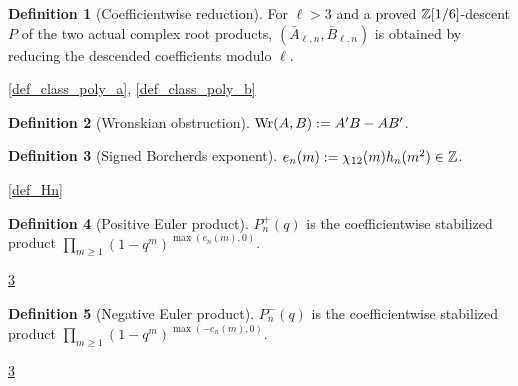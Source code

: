 \documentclass[11pt,a4paper]{article}
\numberwithin{equation}{section}
\theoremstyle{plain}\newtheorem{theorem}{Theorem}[section]\newaliascnt{proposition}{theorem}\newtheorem{proposition}[proposition]{Proposition}\aliascntresetthe{proposition}\newaliascnt{lemma}{theorem}\newtheorem{lemma}[lemma]{Lemma}\aliascntresetthe{lemma}
\theoremstyle{definition}\newaliascnt{definition}{theorem}\newtheorem{definition}[definition]{Definition}\aliascntresetthe{definition}\newaliascnt{notation}{theorem}\newtheorem{notation}[notation]{Notation}\aliascntresetthe{notation}
\providecommand{\lean}[1]{}\providecommand{\leanok}{}
\begin{document}
\begin{definition}[Coefficientwise reduction]\label{def_reduced_class_polys}\lean{SptCM.CM.Repaired.ActualClassPolynomialSpec.actualReducedClassPolynomials}\leanok
For $\ell>3$ and a proved $\mathbb Z[1/6]$-descent $P$ of the two actual complex root products, $(\bar A_{\ell,n},\bar B_{\ell,n})$ is obtained by reducing the descended coefficients modulo $\ell$.
\end{definition}
\begin{uses-statement}\ref{def_class_poly_a}, \ref{def_class_poly_b}\end{uses-statement}
\begin{definition}[Wronskian obstruction]\label{def_wronskian}\lean{SptCM.wronskianObstruction}\leanok
$\operatorname{Wr}(A,B):=A'B-AB'$.
\end{definition}
\begin{definition}[Signed Borcherds exponent]\label{def_signed_exponent}\lean{SptCM.Repair.signedEulerExponent}\leanok
$e_n(m):=\chi_{12}(m)h_n(m^2)\in\mathbb Z$.
\end{definition}
\begin{uses-statement}\ref{def_Hn}\end{uses-statement}
\begin{definition}[Positive Euler product]\label{def_euler_product_plus}\lean{SptCM.Repair.eulerProductPlus}\leanok
$P_n^+(q)$ is the coefficientwise stabilized product $\prod_{m\ge1}(1-q^m)^{\max(e_n(m),0)}$.
\end{definition}
\begin{uses-statement}\ref{def_signed_exponent}\end{uses-statement}
\begin{definition}[Negative Euler product]\label{def_euler_product_minus}\lean{SptCM.Repair.eulerProductMinus}\leanok
$P_n^-(q)$ is the coefficientwise stabilized product $\prod_{m\ge1}(1-q^m)^{\max(-e_n(m),0)}$.
\end{definition}
\begin{uses-statement}\ref{def_signed_exponent}\end{uses-statement}
\end{document}
